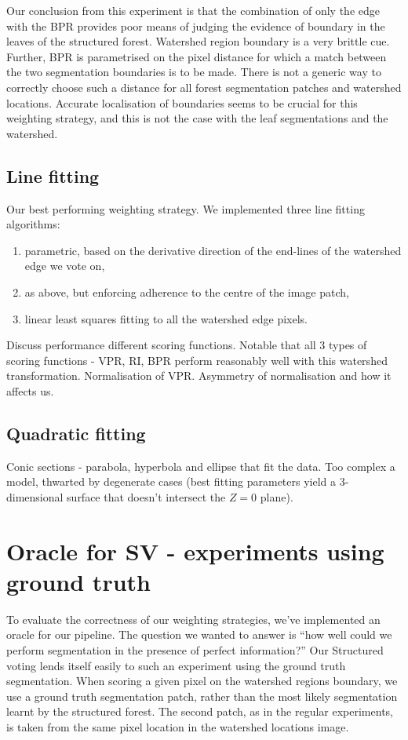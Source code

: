 Our conclusion from this experiment is that the combination of only the edge with the BPR provides poor means of judging the evidence of boundary in the leaves of the structured forest. Watershed region boundary is a very brittle cue. Further, BPR is parametrised on the pixel distance for which a match between the two segmentation boundaries is to be made. There is not a generic way to correctly choose such a distance for all forest segmentation patches and watershed locations. Accurate localisation of boundaries seems to be crucial for this weighting strategy, and this is not the case with the leaf segmentations and the watershed.

\subsection*{Line fitting}
Our best performing weighting strategy. We implemented three line fitting algorithms:
\begin{enumerate}
  \item parametric, based on the derivative direction of the end-lines of the watershed edge we vote on,
  \item as above, but enforcing adherence to the centre of the image patch,
  \item linear least squares fitting to all the watershed edge pixels.
\end{enumerate}

Discuss performance \wrt different scoring functions. Notable that all 3 types of scoring functions - VPR, RI, BPR perform reasonably well with this watershed transformation. Normalisation of VPR. Asymmetry of normalisation and how it affects us.

\subsection*{Quadratic fitting} %
Conic sections - parabola, hyperbola and ellipse that fit the data. Too complex a model, thwarted by degenerate cases (best fitting parameters yield a 3-dimensional surface that doesn't intersect the $Z=0$ plane).

\section[Oracle for Structured voting]{Oracle for SV - experiments using ground truth}
\label{sec:ch5-oracle}
To evaluate the correctness of our weighting strategies, we've implemented an oracle for our pipeline. The question we wanted to answer is ``how well could we perform segmentation in the presence of perfect information?'' Our Structured voting lends itself easily to such an experiment using the ground truth segmentation. 
When scoring a given pixel on the watershed regions boundary, we use a ground truth segmentation patch, rather than the most likely segmentation learnt by the structured forest. The second patch, as in the regular experiments, is taken from the same pixel location in the watershed locations image.

